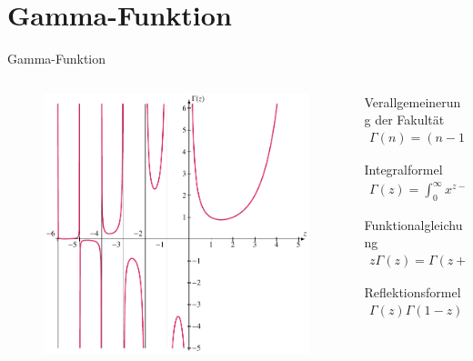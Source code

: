 \section{Gamma-Funktion}

\begin{frame}{Gamma-Funktion}
\begin{columns}

\begin{column}{0.48\textwidth}
\begin{figure}[h]
\centering
\includegraphics[width=1\textwidth]{../images/gammaplot.pdf}
\end{figure}
\end{column}

\begin{column}{0.52\textwidth}
Verallgemeinerung der Fakultät
\begin{align*}
\Gamma(n) = (n-1)!    
\end{align*}

Integralformel
\begin{align*}
\Gamma(z) 
=
\int_0^\infty x^{z-1} e^{-x} \, dx
,\quad
\operatorname{Re} z > 0
\end{align*}

Funktionalgleichung
\begin{align*}
z \Gamma(z)
=
\Gamma(z + 1)
\end{align*}

Reflektionsformel
\begin{align*}
\Gamma(z) \Gamma(1 - z)
=
\frac{\pi}{\sin \pi z}
, \quad
\text{für }
z \notin \mathbb{Z}
\end{align*}

\end{column}
\end{columns}

\end{frame}